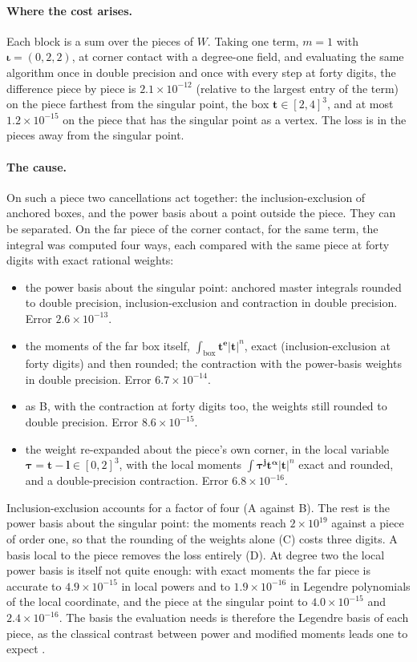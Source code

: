 \documentclass[11pt,a4paper]{article}
\newcommand{\bt}{\mathbf{t}}
\newcommand{\balpha}{\boldsymbol{\alpha}}
\newcommand{\biota}{\boldsymbol{\iota}}
\begin{document}
\paragraph{Where the cost arises.} Each block is a sum over the pieces of $W$. Taking one term, $m=1$ with
$\biota=(0,2,2)$, at corner contact with a degree-one field, and evaluating the same algorithm once in double
precision and once with every step at forty digits, the difference piece by piece is $2.1\times10^{-12}$
(relative to the largest entry of the term) on the piece farthest from the singular point, the box
$\bt\in[2,4]^3$, and at most $1.2\times10^{-15}$ on the piece that has the singular point as a vertex.
The loss is in the pieces away from the singular point.

\paragraph{The cause.} On such a piece two cancellations act together: the inclusion-exclusion of
anchored boxes, and the power basis about a point outside the piece. They can be separated. On the far
piece of the corner contact, for the same term, the integral was computed four ways, each compared with
the same piece at forty digits with exact rational weights:
\begin{itemize}
  \item[A] the power basis about the singular point: anchored master integrals rounded to double precision, inclusion-exclusion and
  contraction in double precision. Error $2.6\times10^{-13}$.
  \item[B] the moments of the far box itself, $\int_{\text{box}}\bt^{\mathbf{e}}|\bt|^n$, exact
  (inclusion-exclusion at forty digits) and then rounded; the contraction with the power-basis weights in
  double precision. Error $6.7\times10^{-14}$.
  \item[C] as B, with the contraction at forty digits too, the weights still rounded to double
  precision. Error $8.6\times10^{-15}$.
  \item[D] the weight re-expanded about the piece's own corner, in the local variable
  $\boldsymbol\tau=\bt-\mathbf{l}\in[0,2]^3$, with the local moments $\int\boldsymbol\tau^{\mathbf{j}}
  \bt^{\balpha}|\bt|^n$ exact and rounded, and a double-precision contraction. Error $6.8\times10^{-16}$.
\end{itemize}
Inclusion-exclusion accounts for a factor of four (A against B). The rest is the power basis about the
singular point: the moments reach $2\times10^{19}$ against a piece of order one, so that the rounding of
the weights alone (C) costs three digits. A basis local to the piece removes the loss entirely (D). At
degree two the local power basis is itself not quite enough: with exact moments the far piece is
accurate to $4.9\times10^{-15}$ in local powers and to $1.9\times10^{-16}$ in Legendre polynomials of the
local coordinate, and the piece at the singular point to $4.0\times10^{-15}$ and $2.4\times10^{-16}$. The
basis the evaluation needs is therefore the Legendre basis of each piece, as the classical contrast between
power and modified moments leads one to expect \citep{Gautschi1970}.
\end{document}
